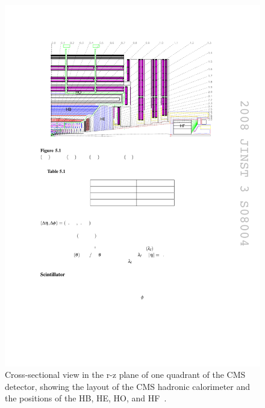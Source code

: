 \begin{figure}[hbtp]
  \begin{center}
    \includegraphics[width=1.75\cmsFigWidth]{figures/cms-hcallayout}
    \caption{Cross-sectional view in the r-z plane of one quadrant of the CMS detector, showing the layout of the CMS hadronic calorimeter and the positions of the HB, HE, HO, and HF~\cite{1748-0221-3-08-S08004}.}
    \label{fig:cms-hcallayout}
  \end{center}
\end{figure}

